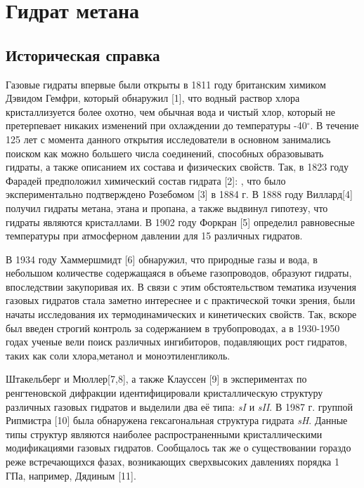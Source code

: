 \chapter{Гидрат метана}
\section{Историческая справка}
\par Газовые гидраты впервые были открыты в 1811 году британским химиком Дэвидом Гемфри, который обнаружил [1], что водный раствор хлора кристаллизуется более охотно, чем обычная вода и чистый хлор, который не претерпевает никаких изменений при охлаждении до температуры -40$^{\circ}$. В течение 125 лет с момента данного открытия исследователи в основном занимались поиском как можно большего числа соединений, способных образовывать гидраты, а также описанием их состава и физических свойств. Так, в 1823 году Фарадей предположил химический состав гидрата [2]: , что было экспериментально подтверждено Розебомом [3] в 1884 г. В 1888 году Виллард[4] получил гидраты метана, этана и пропана, а также выдвинул гипотезу, что гидраты являются кристаллами. В 1902 году Форкран [5] определил равновесные температуры при атмосферном давлении для 15 различных гидратов.

\par В 1934 году Хаммершмидт [6] обнаружил, что природные газы и вода, в небольшом количестве содержащаяся в объеме газопроводов, образуют гидраты, впоследствии закупоривая их. В связи с этим обстоятельством тематика изучения газовых гидратов стала заметно интереснее и с практической точки зрения, были начаты исследования их термодинамических и кинетических свойств. Так, вскоре был введен строгий контроль за содержанием  в трубопроводах, а в 1930-1950 годах ученые вели поиск различных ингибиторов, подавляющих рост гидратов, таких как соли хлора,метанол и моноэтиленгликоль.

\par Штакельберг и Мюллер[7,8], а также Клауссен [9] в экспериментах по ренгтеновской дифракции идентифицировали кристаллическую структуру различных газовых гидратов и выделили два её типа: \textit{sI} и \textit{sII}. В 1987 г. группой Рипмистра [10] была обнаружена гексагональная структура гидрата \textit{sH}. Данные типы структур являются наиболее распространенными кристаллическими модификациями газовых гидратов. Сообщалось так же о существовании гораздо реже встречающихся фазах, возникающих сверхвысоких давлениях порядка 1 ГПа, например, Дядиным [11].

